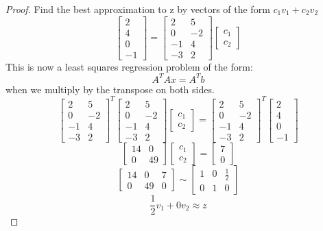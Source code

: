 \documentclass[12pt]{article}
\begin{document}
\begin{proof}
  Find the best approximation to z by vectors of the form $c_1v_1+c_2v_2$
  \[
    \begin{bmatrix}
      2\\4\\0\\-1
    \end{bmatrix}=\begin{bmatrix}
      2&5\\0&-2\\-1&4\\-3&2
  \end{bmatrix}\begin{bmatrix}
    c_1\\c_2
  \end{bmatrix}
  \]
  This is now a least squares regression problem of the form:
  \[
    A^TAx=A^Tb
  \]
  when we multiply by the transpose on both sides.
  \[\begin{bmatrix}
    2&5\\0&-2\\-1&4\\-3&2
  \end{bmatrix}^T\begin{bmatrix}
    2&5\\0&-2\\-1&4\\-3&2
  \end{bmatrix}\begin{bmatrix}
  c_1\\c_2
  \end{bmatrix}=\begin{bmatrix}
    2&5\\0&-2\\-1&4\\-3&2
  \end{bmatrix}^T
  \begin{bmatrix}
    2\\4\\0\\-1
  \end{bmatrix}
  \]
  \[
    \begin{bmatrix}
      14&0\\0&49
    \end{bmatrix}\begin{bmatrix}
    c_1\\c_2
  \end{bmatrix}=\begin{bmatrix}
      7\\0
  \end{bmatrix}
  \]
  \[
    \begin{bmatrix}
      14&0&7\\0&49&0
    \end{bmatrix}\sim
    \begin{bmatrix}
      1&0&\frac{1}{2}\\
      0&1&0
    \end{bmatrix}

  \]
  $$\frac{1}{2}v_1+0v_2 \approx z$$
\end{proof}
\end{document}
